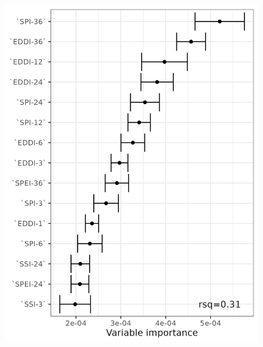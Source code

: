 \documentclass[
  authoryear,
  preprint,
  3p,
  onecolumn]{elsarticle}
\begin{document}
\begin{figure}[!ht]
\begin{minipage}{0.33\linewidth}
{\includegraphics[width=1\textwidth,height=\textheight]{figs/fig_errorbar_resample_random_forest_trends_Savanna_norte grande.png}

}


\end{minipage}%
%
\begin{minipage}{0.33\linewidth}

\centering{

}
\end{minipage}
\end{figure}
\end{document}
